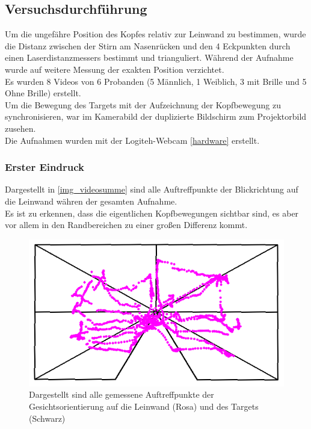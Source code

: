 \subsection{Versuchsdurchführung}
Um die ungefähre Position des Kopfes relativ zur Leinwand zu bestimmen, wurde die Distanz zwischen der Stirn am Nasenrücken und den 4 Eckpunkten durch einen Laserdistanzmessers bestimmt und trianguliert. Während der Aufnahme wurde auf weitere Messung der exakten Position verzichtet.\\
Es wurden 8 Videos von 6 Probanden (5 Männlich, 1 Weiblich, 3 mit Brille und 5 Ohne Brille) erstellt.\\
Um die Bewegung des Targets mit der Aufzeichnung der Kopfbewegung zu synchronisieren, war im Kamerabild der duplizierte Bildschirm zum Projektorbild zusehen.\\
Die Aufnahmen wurden mit der Logiteh-Webcam \autoref{hardware} erstellt.
\subsubsection{Erster Eindruck}
Dargestellt in \autoref{img_videosumme} sind alle Auftreffpunkte der Blickrichtung auf die Leinwand währen der gesamten Aufnahme.\\
Es ist zu erkennen, dass die eigentlichen Kopfbewegungen sichtbar sind, es aber vor allem in den Randbereichen zu einer großen Differenz kommt.\\
\begin{figure}
	\centering
	\includegraphics[width=0.7\linewidth]{OpenFace_Img/VideoSumme}
	\caption{Dargestellt sind alle gemessene Auftreffpunkte der Gesichtsorientierung auf die Leinwand (Rosa) und des Targets (Schwarz)}
	\label{img_videosumme}
\end{figure}
